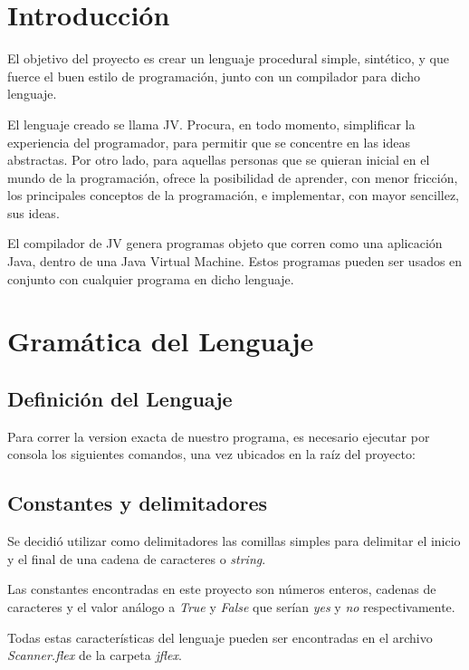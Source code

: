 \documentclass{article}
\begin{document}

\clearpage
\tableofcontents

\clearpage

\section{Introducción}
\par El objetivo del proyecto es crear un lenguaje procedural simple, sintético, y que fuerce el buen estilo de programación, junto con un compilador para dicho lenguaje.\\
\par El lenguaje creado se llama JV. Procura, en todo momento, simplificar la experiencia del programador, para permitir que se concentre en las ideas abstractas. Por otro lado, para aquellas personas que se quieran inicial en el mundo de la programación, ofrece la posibilidad de aprender, con menor fricción, los principales conceptos de la programación, e implementar, con mayor sencillez, sus ideas.\\
\par El compilador de JV genera  programas objeto que corren como una aplicación Java, dentro de una Java Virtual Machine. Estos programas pueden ser usados en conjunto con cualquier programa en dicho lenguaje.\\
\clearpage


\section{Gramática del Lenguaje}

\subsection{Definición del Lenguaje}
\par Para correr la version exacta de nuestro programa, es necesario ejecutar por consola los siguientes comandos, una vez ubicados en la raíz del proyecto:
\subsection{Constantes y delimitadores}
\par Se decidió utilizar como delimitadores las comillas simples para delimitar el inicio y el final de una cadena de caracteres o \textit{string}.
\par Las constantes encontradas en este proyecto son números enteros, cadenas de caracteres y el valor análogo a \textit{True} y \textit{False} que serían \textit{yes} y \textit{no} respectivamente.
\par Todas estas características del lenguaje pueden ser encontradas en el archivo \textit{Scanner.flex} de la carpeta \textit{jflex}. 
\end{document}
